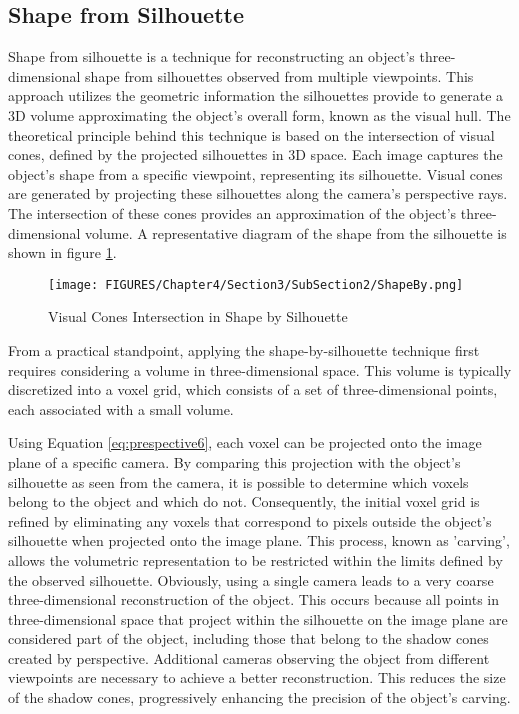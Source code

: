 \subsection{Shape from Silhouette}

Shape from silhouette is a technique for reconstructing an object's three-dimensional shape from silhouettes observed from multiple viewpoints. This approach utilizes the geometric information the silhouettes provide to generate a 3D volume approximating the object's overall form, known as the visual hull. 
The theoretical principle behind this technique is based on the intersection of visual cones, defined by the projected silhouettes in 3D space. Each image captures the object's shape from a specific viewpoint, representing its silhouette. Visual cones are generated by projecting these silhouettes along the camera's perspective rays. The intersection of these cones provides an approximation of the object's three-dimensional volume. 
A representative diagram of the shape from the silhouette is shown in figure \ref{fig:shapeby}.

\begin{figure}[!h]
  \centering
  \texttt{[image: FIGURES/Chapter4/Section3/SubSection2/ShapeBy.png]}
  \caption{Visual Cones Intersection in Shape by Silhouette}
  \label{fig:shapeby}  
\end{figure}

From a practical standpoint, applying the shape-by-silhouette technique first requires considering a volume in three-dimensional space. This volume is typically discretized into a voxel grid, which consists of a set of three-dimensional points, each associated with a small volume.

Using Equation \ref{eq:prespective6}, each voxel can be projected onto the image plane of a specific camera. By comparing this projection with the object's silhouette as seen from the camera, it is possible to determine which voxels belong to the object and which do not. Consequently, the initial voxel grid is refined by eliminating any voxels that correspond to pixels outside the object's silhouette when projected onto the image plane. This process, known as 'carving', allows the volumetric representation to be restricted within the limits defined by the observed silhouette.
Obviously, using a single camera leads to a very coarse three-dimensional reconstruction of the object.
This occurs because all points in three-dimensional space that project within the silhouette on the image plane are considered part of the object, including those that belong to the shadow cones created by perspective. Additional cameras observing the object from different viewpoints are necessary to achieve a better reconstruction. This reduces the size of the shadow cones, progressively enhancing the precision of the object's carving.

